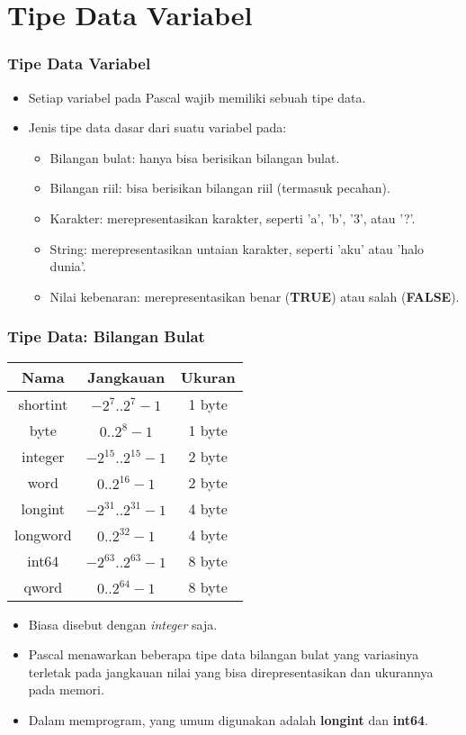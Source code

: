 \section{Tipe Data Variabel}
\frame{\sectionpage}

\begin{frame}
\frametitle{Tipe Data Variabel}
\begin{itemize}
  \item Setiap variabel pada Pascal wajib memiliki sebuah \alert{tipe data}.
  \item Jenis tipe data dasar dari suatu variabel pada:
  \begin{itemize}
    \item Bilangan bulat: hanya bisa berisikan bilangan bulat.
    \item Bilangan riil: bisa berisikan bilangan riil (termasuk pecahan).
    \item Karakter: merepresentasikan karakter, seperti 'a', 'b', '3', atau '?'.
    \item String: merepresentasikan untaian karakter, seperti 'aku' atau 'halo dunia'.
    \item Nilai kebenaran: merepresentasikan benar (\textbf{TRUE}) atau salah (\textbf{FALSE}).
  \end{itemize}
\end{itemize}
\end{frame}

\begin{frame}
\frametitle{Tipe Data: Bilangan Bulat}
\begin{table}[ht]
  \begin{tabular}{|c|c|c|}
    \hline Nama  & Jangkauan  & Ukuran \\
    \hline shortint & $-2^7 .. 2^7-1$ & 1 byte \\
    \hline byte & $0 .. 2^8-1$ & 1 byte\\
    \hline integer & $-2^{15} .. 2^{15}-1$ & 2 byte\\
    \hline word & $0 .. 2^{16}-1$ & 2 byte\\
    \hline longint & $-2^{31} .. 2^{31}-1$ & 4 byte\\
    \hline longword & $0 .. 2^{32}-1$ & 4 byte\\
    \hline int64 & $-2^{63} .. 2^{63}-1$ & 8 byte\\
    \hline qword & $0 .. 2^{64}-1$ & 8 byte\\
    \hline
  \end{tabular}
\end{table}
\begin{itemize}
  \item Biasa disebut dengan \textit{integer} saja.
  \item Pascal menawarkan beberapa tipe data bilangan bulat yang variasinya terletak pada jangkauan nilai yang bisa direpresentasikan dan ukurannya pada memori.
  \item Dalam memprogram, yang umum digunakan adalah \alert{\textbf{longint}} dan \alert{\textbf{int64}}.
\end{itemize}
\end{frame}

